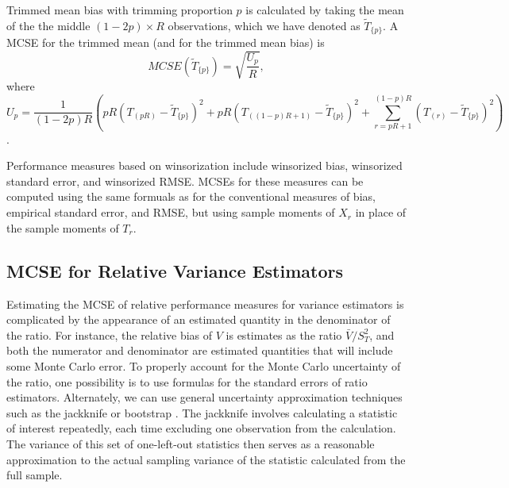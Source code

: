 \documentclass[
]{book}
\begin{document}
Trimmed mean bias with trimming proportion \(p\) is calculated by taking the mean of the the middle \((1 - 2p) \times R\) observations, which we have denoted as \(\tilde{T}_{\{p\}}\). A MCSE for the trimmed mean (and for the trimmed mean bias) is
\[
MCSE\left(\tilde{T}_{\{p\}}\right) = \sqrt{\frac{U_p}{R}},
\label{eq:MCSE-trimmed-mean}
\]
where
\[
U_p = \frac{1}{(1 - 2p)R}\left( pR\left(T_{(pR)}  - \tilde{T}_{\{p\}}\right)^2 + pR\left(T_{((1-p)R + 1)}  - \tilde{T}_{\{p\}}\right)^2 + \sum_{r=pR + 1}^{(1 - p)R} \left(T_{(r)} - \tilde{T}_{\{p\}}\right)^2 \right)
\]
\citep[Eq. 2.85]{Maronna2006robust}.

Performance measures based on winsorization include winsorized bias, winsorized standard error, and winsorized RMSE.
MCSEs for these measures can be computed using the same formuals as for the conventional measures of bias, empirical standard error, and RMSE, but using sample moments of \(\hat{X}_r\) in place of the sample moments of \(T_r\).

\subsection{MCSE for Relative Variance Estimators}\label{MCSE-for-relative-variance}

Estimating the MCSE of relative performance measures for variance estimators is complicated by the appearance of an estimated quantity in the denominator of the ratio.
For instance, the relative bias of \(V\) is estimates as the ratio \(\bar{V} / S_T^2\), and both the numerator and denominator are estimated quantities that will include some Monte Carlo error.
To properly account for the Monte Carlo uncertainty of the ratio, one possibility is to use formulas for the standard errors of ratio estimators.
Alternately, we can use general uncertainty approximation techniques such as the jackknife or bootstrap \citep{boos2015Assessing}.
The jackknife involves calculating a statistic of interest repeatedly, each time excluding one observation from the calculation.
The variance of this set of one-left-out statistics then serves as a reasonable approximation to the actual sampling variance of the statistic calculated from the full sample.
\end{document}
